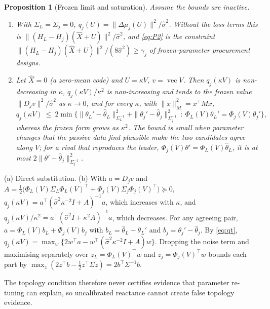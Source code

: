 \documentclass[journal,onecolumn,11pt]{IEEEtran}
\newtheorem{proposition}{Proposition}
\DeclareMathOperator{\vect}{vec}
\newcommand{\tp}{^{\top}}
\begin{document}
\begin{proposition}[Frozen limit and saturation]\label{prop:saturation}
Assume the bounds are inactive.
\begin{enumerate}
\item[(a)] With $\Sigma_L=\Sigma_j=0$, $q_j(U)=\|\Delta\mu_j(U)\|^2/\hat\sigma^2$. Without the loss terms this is $\|(H_L-H_j)(\hat X+U)\|^2/\hat\sigma^2$, and \eqref{eq:P2} is the constraint $\|(H_L-H_j)(\hat X+U)\|^2/(8\hat\sigma^2)\ge\gamma_j$ of frozen-parameter procurement designs.
\item[(b)] Let $\hat X=0$ (a zero-mean code) and $U=\kappa V$, $v=\vect V$. Then $q_j(\kappa V)$ is non-decreasing in $\kappa$, $q_j(\kappa V)/\kappa^2$ is non-increasing and tends to the frozen value $\|D_jv\|^2/\hat\sigma^2$ as $\kappa\to0$, and for every $\kappa$, with $\|x\|_M^2=x\tp Mx$,
\[
q_j(\kappa V)\ \le\ 2\min\Big\{\|\theta_L'-\hat\theta_L\|^2_{\Sigma_L^{-1}}+\|\theta_j'-\hat\theta_j\|^2_{\Sigma_j^{-1}}\ :\ \Phi_L(V)\theta_L'=\Phi_j(V)\theta_j'\Big\},
\]
whereas the frozen form grows as $\kappa^2$. The bound is small when parameter changes that the passive data find plausible make the two candidates agree along $V$; for a rival that reproduces the leader, $\Phi_j(V)\theta'=\Phi_L(V)\hat\theta_L$, it is at most $2\|\theta'-\hat\theta_j\|^2_{\Sigma_j^{-1}}$.
\end{enumerate}
\end{proposition}
\begin{IEEEproof}
(a) Direct substitution. (b) With $a=D_jv$ and $A=\tfrac12\big(\Phi_L(V)\Sigma_L\Phi_L(V)\tp+\Phi_j(V)\Sigma_j\Phi_j(V)\tp\big)\succeq0$, $q_j(\kappa V)=a\tp(\hat\sigma^2\kappa^{-2}I+A)^{-1}a$, which increases with $\kappa$, and $q_j(\kappa V)/\kappa^2=a\tp(\hat\sigma^2I+\kappa^2A)^{-1}a$, which decreases. For any agreeing pair, $a=\Phi_L(V)b_L+\Phi_j(V)b_j$ with $b_L=\hat\theta_L-\theta_L'$ and $b_j=\theta_j'-\hat\theta_j$. By \eqref{eq:qt}, $q_j(\kappa V)=\max_w\{2w\tp a-w\tp(\hat\sigma^2\kappa^{-2}I+A)w\}$. Dropping the noise term and maximising separately over $z_L=\Phi_L(V)\tp w$ and $z_j=\Phi_j(V)\tp w$ bounds each part by $\max_z(2z\tp b-\tfrac12z\tp\Sigma z)=2b\tp\Sigma^{-1}b$.
\end{IEEEproof}
The topology condition therefore never certifies evidence that parameter re-tuning can explain, so uncalibrated reactance cannot create false topology evidence.
\end{document}

